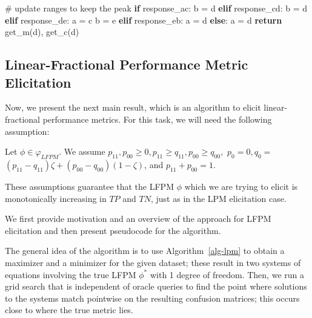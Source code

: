 \documentclass[
  letterpaper,
  numbers=noenddot,
  DIV=11]{scrreprt}
\newenvironment{Shaded}{\begin{snugshade}}{\end{snugshade}}
\newcommand{\CommentTok}[1]{\textcolor[rgb]{0.37,0.37,0.37}{#1}}
\newcommand{\ControlFlowTok}[1]{\textcolor[rgb]{0.00,0.23,0.31}{\textbf{#1}}}
\newcommand{\NormalTok}[1]{\textcolor[rgb]{0.00,0.23,0.31}{#1}}
\newcommand{\OperatorTok}[1]{\textcolor[rgb]{0.37,0.37,0.37}{#1}}
\theoremstyle{plain}
\theoremstyle{definition}
\theoremstyle{plain}
\theoremstyle{remark}
\begin{document}
\begin{tcolorbox}[colframe=.grey, title=\faCode \enspace Code]
\begin{Shaded}
\begin{Highlighting}[numbers=left,,]
        \CommentTok{\# update ranges to keep the peak}
        \ControlFlowTok{if}\NormalTok{ response\_ac:}
\NormalTok{            b }\OperatorTok{=}\NormalTok{ d}
        \ControlFlowTok{elif}\NormalTok{ response\_cd:}
\NormalTok{            b }\OperatorTok{=}\NormalTok{ d}
        \ControlFlowTok{elif}\NormalTok{ response\_de:}
\NormalTok{            a }\OperatorTok{=}\NormalTok{ c}
\NormalTok{            b }\OperatorTok{=}\NormalTok{ e}
        \ControlFlowTok{elif}\NormalTok{ response\_eb:}
\NormalTok{            a }\OperatorTok{=}\NormalTok{ d}
        \ControlFlowTok{else}\NormalTok{:}
\NormalTok{            a }\OperatorTok{=}\NormalTok{ d}
    \ControlFlowTok{return}\NormalTok{ get\_m(d), get\_c(d)}
\end{Highlighting}
\end{Shaded}

\end{tcolorbox}

\subsection{Linear-Fractional Performance Metric
Elicitation}\label{sec-lfpm-elicitation}

Now, we present the next main result, which is an algorithm to elicit
linear-fractional performance metrics. For this task, we will need the
following assumption:

Let \(\phi \in \varphi_{L F P M}\). We assume
\(p_{11}, p_{00} \geq 0, p_{11} \geq q_{11}, p_{00} \geq q_{00},\)
\(p_{0}=0, q_{0}=\)
\(\left(p_{11}-q_{11}\right) \zeta+\left(p_{00}-q_{00}\right)(1-\zeta)\),
and \(p_{11}+p_{00}=1\).

These assumptions guarantee that the LFPM \(\phi\) which we are trying
to elicit is monotonically increasing in \(TP\) and \(TN\), just as in
the LPM elicitation case.

We first provide motivation and an overview of the approach for LFPM
elicitation and then present pseudocode for the algorithm.

The general idea of the algorithm is to use  Algorithm~\ref{alg-lpm}  to
obtain a maximizer and a minimizer for the given dataset; these result
in two systems of equations involving the true LFPM \(\phi^*\) with 1
degree of freedom. Then, we run a grid search that is independent of
oracle queries to find the point where solutions to the systems match
pointwise on the resulting confusion matrices; this occurs close to
where the true metric lies.
\end{document}
